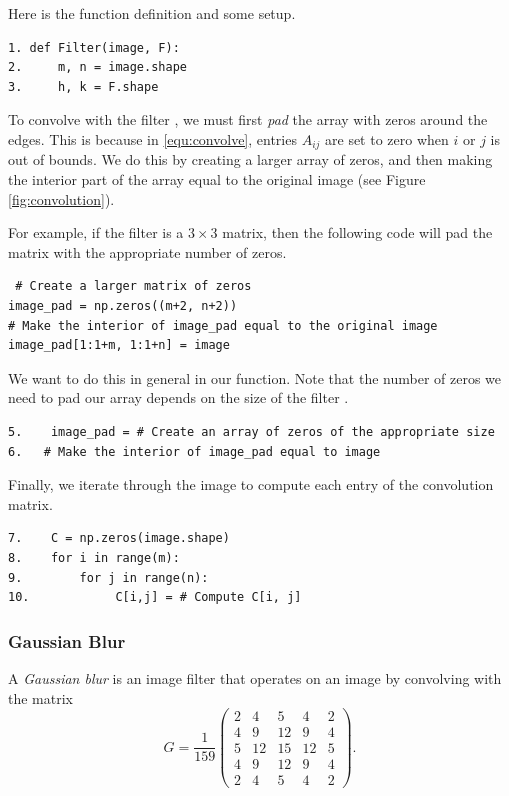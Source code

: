Here is the function definition and some setup.

\begin{lstlisting}
1. def Filter(image, F):
2.     m, n = image.shape
3.     h, k = F.shape
\end{lstlisting}

To convolve  with the filter , we must first \emph{pad} the array  with zeros around the edges.
This is because in \eqref{equ:convolve}, entries $A_{ij}$ are set to zero when $i$ or $j$ is out of bounds.
We do this by creating a larger array of zeros, and then making the interior part of the array equal to the original image (see Figure \ref{fig:convolution}).

For example, if the filter is a $3 \times 3$ matrix, then the following code will pad the matrix with the appropriate number of zeros.

\begin{lstlisting}
 # Create a larger matrix of zeros
image_pad = np.zeros((m+2, n+2))
# Make the interior of image_pad equal to the original image
image_pad[1:1+m, 1:1+n] = image
\end{lstlisting}

We want to do this in general in our function.  Note that the number of zeros we need to pad our array depends on the size of the filter .

\begin{lstlisting}
5.    image_pad = # Create an array of zeros of the appropriate size
6.   # Make the interior of image_pad equal to image
\end{lstlisting}

Finally, we iterate through the image to compute each entry of the convolution matrix.

\begin{lstlisting}
7.    C = np.zeros(image.shape)
8.    for i in range(m):
9.        for j in range(n):
10.            C[i,j] = # Compute C[i, j]
\end{lstlisting}

\subsubsection*{Gaussian Blur} %

A \emph{Gaussian blur} is an image filter that operates on an image by convolving with the matrix
\[
G = \frac{1}{159}\begin{pmatrix}
2&4&5&4&2\\
4&9&12&9&4\\
5&12&15&12&5\\
4&9&12&9&4\\
2&4&5&4&2
\end{pmatrix}.
\]

